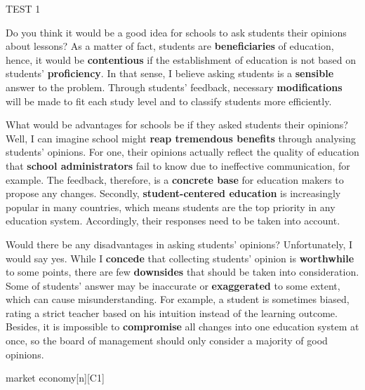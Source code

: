 \begin{glossarymc}[Cambridge 8]
\begin{test}{TEST 1}
    \begin{qa}{Do you think it would be a good idea for schools to ask students their opinions about lessons?}
    As a matter of fact, students are \textbf{beneficiaries} of education, hence, it would be \textbf{contentious} if the establishment of education is not based on students' \textbf{proficiency}. In that sense, I believe asking students is a \textbf{sensible} answer to the problem. Through students' feedback, necessary \textbf{modifications} will be made to fit each study level and to classify students more efficiently.
    \end{qa}

    \begin{qa}{What would be advantages for schools be if they asked students their opinions?}
    Well, I can imagine school might \textbf{reap tremendous benefits} through analysing students' opinions. For one, their opinions actually reflect the quality of education that \textbf{school administrators} fail to know due to ineffective communication, for example. The feedback, therefore, is a \textbf{concrete base} for education makers to propose any changes. Secondly, \textbf{student-centered education} is increasingly popular in many countries, which means students are the top priority in any education system. Accordingly, their responses need to be taken into account.
    \end{qa}

    \begin{qa}{Would there be any disadvantages in asking students' opinions?}
    Unfortunately, I would say yes. While I \textbf{concede} that collecting students' opinion is \textbf{worthwhile} to some points, there are few \textbf{downsides} that should be taken into consideration. Some of students' answer may be inaccurate or \textbf{exaggerated} to some extent, which can cause misunderstanding. For example, a student is sometimes biased, rating a strict teacher based on his intuition instead of the learning outcome. Besides, it is impossible to \textbf{compromise} all changes into one education system at once, so the board of management should only consider a majority of good opinions.
    \end{qa}
    
        \begin{VocabExplain}[Part 3]
            \begin{ExplainCard}{market economy}[n][C1]
            \end{ExplainCard}


\end{VocabExplain}
\end{test}
\end{glossarymc}
